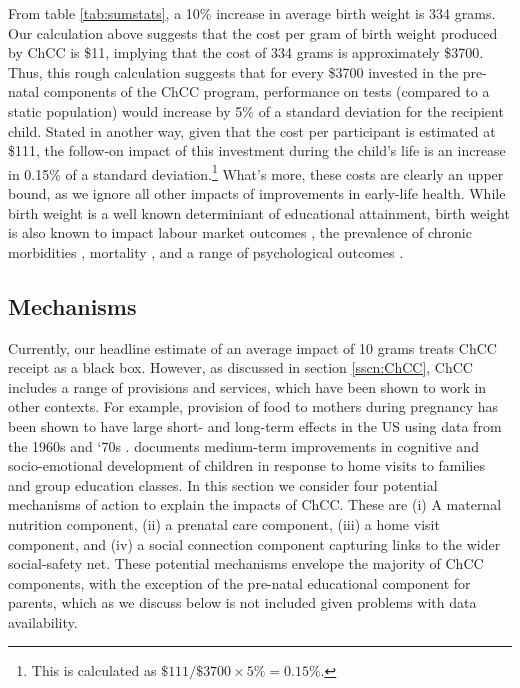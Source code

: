 \documentclass[12pt]{article}
\begin{document}
\begin{spacing}{1.4}
From table \ref{tab:sumstats}, a 10\% increase in average birth weight is
334 grams.  Our calculation above suggests that the cost per gram of birth
weight produced by ChCC is \$11, implying that the cost of 334 grams is
approximately \$3700.  Thus, this rough calculation suggests that for every
\$3700 invested in the pre-natal components of the ChCC program, performance
on tests (compared to a static population) would increase by 5\% of a
standard deviation for the recipient child.  Stated in another way, given
that the cost per participant is estimated at \$111, the follow-on impact of
this investment during the child's life is an increase in 0.15\% of a standard
deviation.\footnote{This is calculated as $\$111/\$3700\times5\%=0.15\%$.}
What's more, these costs are clearly an upper bound,
as we ignore all other impacts of improvements in early-life health.  While
birth weight is a well known determiniant of educational attainment, birth
weight is also known to impact labour market outcomes
\citep{JohnsonSchoeni2011,CookFletcher2015,BehrmanRosenzweig2004,
  RosenzweigZhang2013,Caseetal2005}, the prevalence of chronic morbidities
\citep{Barker1995,AlmondMazumder2005,JohnsonSchoeni2011b}, mortality
\citep{vandenBergetal2006}, and a range of psychological outcomes
\citep{Fletcher2011}.

\subsection{Mechanisms}
\label{scn:Mechanisms}
Currently, our headline estimate of an average impact of 10 grams treats
ChCC receipt as a black box.  However, as discussed in section
\ref{sscn:ChCC}, ChCC includes a range of provisions and services, which
have been shown to work in other contexts.  For example, provision of food
to mothers during pregnancy has been shown to have large short- and
long-term effects in the US using data from the 1960s and `70s
\citep{Almondetal2011,Hoynesetal2016}. \citet{Doyle2017} documents
medium-term improvements in cognitive and socio-emotional development
of children in response to home visits to families and group education
classes.  In this section we consider four potential mechanisms of action
to explain the impacts of ChCC.  These are (i) A maternal nutrition component,
(ii) a prenatal care component, (iii) a home visit component, and (iv) a social
connection component capturing links to the wider social-safety net.  These
potential mechanisms envelope the majority of ChCC components, with the
exception of the pre-natal educational component for parents, which as
we discuss below is not included given problems with data availability.


\end{spacing}
\end{document}
